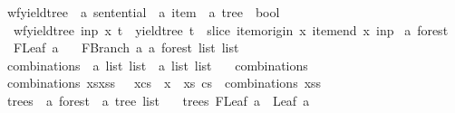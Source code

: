 \begin{isabellebody}
\isanewline
{}\isamarkupfalse%
\ wf{\isacharunderscore}{\kern0pt}yield{\isacharunderscore}{\kern0pt}tree\ {\isacharcolon}{\kern0pt}{\isacharcolon}{\kern0pt}\ {\isachardoublequoteopen}{\isacharprime}{\kern0pt}a\ sentential\ {\isasymRightarrow}\ {\isacharprime}{\kern0pt}a\ item\ {\isasymRightarrow}\ {\isacharprime}{\kern0pt}a\ tree\ {\isasymRightarrow}\ bool{\isachardoublequoteclose}\ \isanewline
\ \ {\isachardoublequoteopen}wf{\isacharunderscore}{\kern0pt}yield{\isacharunderscore}{\kern0pt}tree\ inp\ x\ t\ {\isasymequiv}\ yield{\isacharunderscore}{\kern0pt}tree\ t\ {\isacharequal}{\kern0pt}\ slice\ {\isacharparenleft}{\kern0pt}item{\isacharunderscore}{\kern0pt}origin\ x{\isacharparenright}{\kern0pt}\ {\isacharparenleft}{\kern0pt}item{\isacharunderscore}{\kern0pt}end\ x{\isacharparenright}{\kern0pt}\ inp{\isachardoublequoteclose}\isanewline
\isanewline
{}\isamarkupfalse%
\ {\isacharprime}{\kern0pt}a\ forest\ {\isacharequal}{\kern0pt}\isanewline
\ \ FLeaf\ {\isacharprime}{\kern0pt}a\isanewline
\ \ {\isacharbar}{\kern0pt}\ FBranch\ {\isacharprime}{\kern0pt}a\ {\isachardoublequoteopen}{\isacharprime}{\kern0pt}a\ forest\ list\ list{\isachardoublequoteclose}\isanewline
\isanewline
{}\isamarkupfalse%
\ combinations\ {\isacharcolon}{\kern0pt}{\isacharcolon}{\kern0pt}\ {\isachardoublequoteopen}{\isacharprime}{\kern0pt}a\ list\ list\ {\isasymRightarrow}\ {\isacharprime}{\kern0pt}a\ list\ list{\isachardoublequoteclose}\ \isanewline
\ \ {\isachardoublequoteopen}combinations\ {\isacharbrackleft}{\kern0pt}{\isacharbrackright}{\kern0pt}\ {\isacharequal}{\kern0pt}\ {\isacharbrackleft}{\kern0pt}{\isacharbrackleft}{\kern0pt}{\isacharbrackright}{\kern0pt}{\isacharbrackright}{\kern0pt}{\isachardoublequoteclose}\isanewline
{\isacharbar}{\kern0pt}\ {\isachardoublequoteopen}combinations\ {\isacharparenleft}{\kern0pt}xs{\isacharhash}{\kern0pt}xss{\isacharparenright}{\kern0pt}\ {\isacharequal}{\kern0pt}\ {\isacharbrackleft}{\kern0pt}\ x{\isacharhash}{\kern0pt}cs\ {\isachardot}{\kern0pt}\ x\ {\isacharless}{\kern0pt}{\isacharminus}{\kern0pt}\ xs{\isacharcomma}{\kern0pt}\ cs\ {\isacharless}{\kern0pt}{\isacharminus}{\kern0pt}\ combinations\ xss\ {\isacharbrackright}{\kern0pt}{\isachardoublequoteclose}\isanewline
\isanewline
{}\isamarkupfalse%
\ trees\ {\isacharcolon}{\kern0pt}{\isacharcolon}{\kern0pt}\ {\isachardoublequoteopen}{\isacharprime}{\kern0pt}a\ forest\ {\isasymRightarrow}\ {\isacharprime}{\kern0pt}a\ tree\ list{\isachardoublequoteclose}\ \isanewline
\ \ {\isachardoublequoteopen}trees\ {\isacharparenleft}{\kern0pt}FLeaf\ a{\isacharparenright}{\kern0pt}\ {\isacharequal}{\kern0pt}\ {\isacharbrackleft}{\kern0pt}Leaf\ a{\isacharbrackright}{\kern0pt}{\isachardoublequoteclose}\isanewline

\end{isabellebody}
